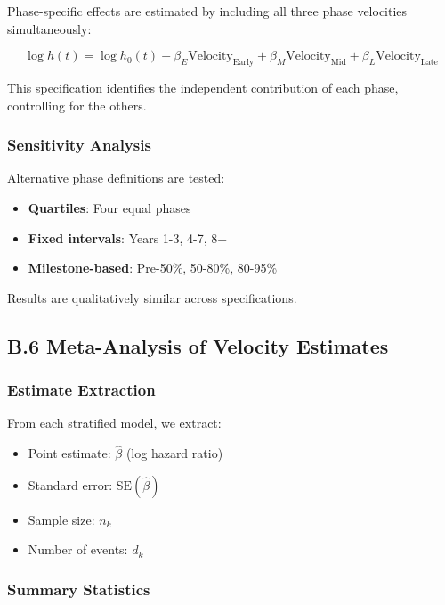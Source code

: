 \documentclass[
  12pt,
  letterpaper,
]{article}
\providecommand{\tightlist}{%
  \setlength{\itemsep}{0pt}\setlength{\parskip}{0pt}}
\begin{document}
Phase-specific effects are estimated by including all three phase
velocities simultaneously:

\[
\log h(t) = \log h_0(t) + \beta_E \text{Velocity}_{\text{Early}} + \beta_M \text{Velocity}_{\text{Mid}} + \beta_L \text{Velocity}_{\text{Late}}
\]

This specification identifies the independent contribution of each
phase, controlling for the others.

\subsubsection{Sensitivity Analysis}\label{sensitivity-analysis}

Alternative phase definitions are tested:

\begin{itemize}
\tightlist
\item
  \textbf{Quartiles}: Four equal phases
\item
  \textbf{Fixed intervals}: Years 1-3, 4-7, 8+
\item
  \textbf{Milestone-based}: Pre-50\%, 50-80\%, 80-95\%
\end{itemize}

Results are qualitatively similar across specifications.

\subsection{B.6 Meta-Analysis of Velocity
Estimates}\label{b.6-meta-analysis-of-velocity-estimates}

\subsubsection{Estimate Extraction}\label{estimate-extraction}

From each stratified model, we extract:

\begin{itemize}
\tightlist
\item
  Point estimate: \(\hat{\beta}\) (log hazard ratio)
\item
  Standard error: \(\text{SE}(\hat{\beta})\)
\item
  Sample size: \(n_k\)
\item
  Number of events: \(d_k\)
\end{itemize}

\subsubsection{Summary Statistics}\label{summary-statistics}
\end{document}
